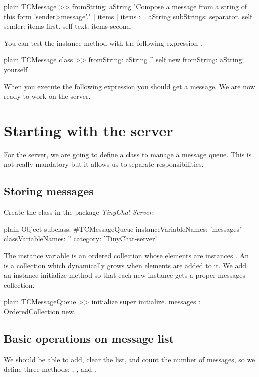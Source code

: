 \documentclass[10pt,twoside,english]{_support/latex/sbabook/sbabook}
\begin{document}
\begin{displaycode}{plain}
TCMessage >> fromString: aString
	"Compose a message from a string of this form 'sender>message'."
	| items |
	items := aString subStrings: separator.
	self sender: items first.
	self text: items second.
\end{displaycode}

You can test the instance method with the following expression .

\begin{displaycode}{plain}
TCMessage class >> fromString: aString
	^ self new 
		fromString: aString;
		yourself
\end{displaycode}

When you execute the following expression  you should get a message.
We are now ready to work on the server.
\section{Starting with the server}
For the server, we are going to define a class to manage a message queue. This is not really mandatory but it allows
us to separate responsibilities. 
\subsection{Storing messages}
Create the class  in the package \textit{TinyChat-Server}. 

\begin{displaycode}{plain}
Object subclass: #TCMessageQueue
	instanceVariableNames: 'messages'
	classVariableNames: ''
	category: 'TinyChat-server'
\end{displaycode}

The  instance variable is an ordered collection whose elements are instances .
An  is a collection which dynamically grows when elements are added to it.
We add an instance initialize method so that each new instance gets a proper messages collection.

\begin{displaycode}{plain}
TCMessageQueue >> initialize
	super initialize.
	messages := OrderedCollection new.
\end{displaycode}
\subsection{Basic operations on message list }
We should be able to add, clear the list, and count the number of messages, so we define three methods: , , and .
\end{document}
